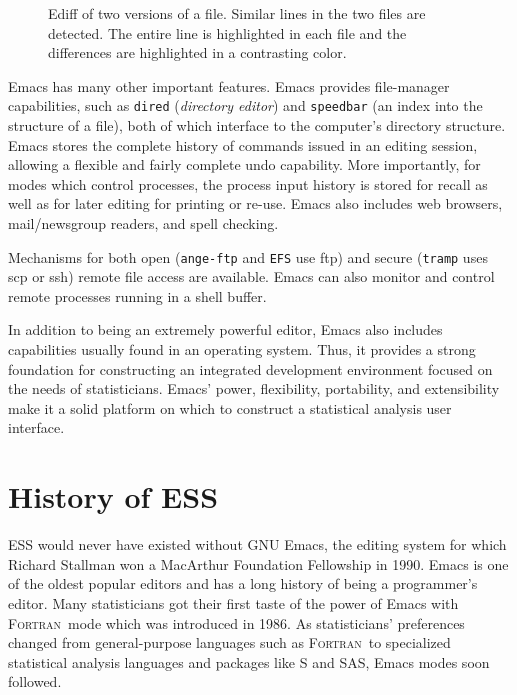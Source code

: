 \documentclass{article}
\newcommand*{\SAS}{\textsc{SAS}}
\newcommand*{\Fortran}{\textsc{Fortran}}
\newcommand{\stexttt}[1]{{\small\texttt{#1}}}
\begin{document}
\begin{figure}[tbp]
  \caption{Ediff of two versions of a file.  Similar lines in the two files
are detected.  The entire line is highlighted in each file and the differences
are highlighted in a contrasting color.}
  \label{fig:ediff}
\end{figure}

Emacs has many other important features.  Emacs provides file-manager
capabilities, such as \stexttt{dired} (\textit{directory editor}) and
\stexttt{speedbar} (an index into the structure of a file), both of
which interface to the computer's directory structure.  Emacs stores
the complete history of commands issued in an editing session,
allowing a flexible and fairly complete undo capability.  More
importantly, for modes which control processes, the process input
history is stored for recall as well as for later editing for printing
or re-use.  Emacs also includes web browsers, mail/newsgroup readers,
and spell checking.

Mechanisms for both open (\stexttt{ange-ftp} and \stexttt{EFS} use
ftp) and secure (\stexttt{tramp} uses scp or ssh) remote file access
are available.  Emacs can also monitor and control remote processes
running in a shell buffer.

In addition to being an extremely powerful editor, Emacs also includes
capabilities usually found in an operating system.  Thus, it provides
a strong foundation for constructing an integrated development
environment focused on the needs of statisticians.  Emacs' power,
flexibility, portability, and extensibility make it a solid platform
on which to construct a statistical analysis user interface.

\section{History of ESS}
\label{sec:ESS:history}

ESS would never have existed without GNU Emacs, the editing system for
which Richard Stallman won a MacArthur Foundation Fellowship in 1990.
Emacs is one of the oldest popular editors and has a long history of
being a programmer's editor.  Many statisticians got their first taste
of the power of Emacs with \Fortran\ mode which was introduced in
1986.  As statisticians' preferences changed from general-purpose
languages such as \Fortran\ to specialized statistical analysis
languages and packages like S and \SAS, Emacs modes soon followed.
\end{document}
